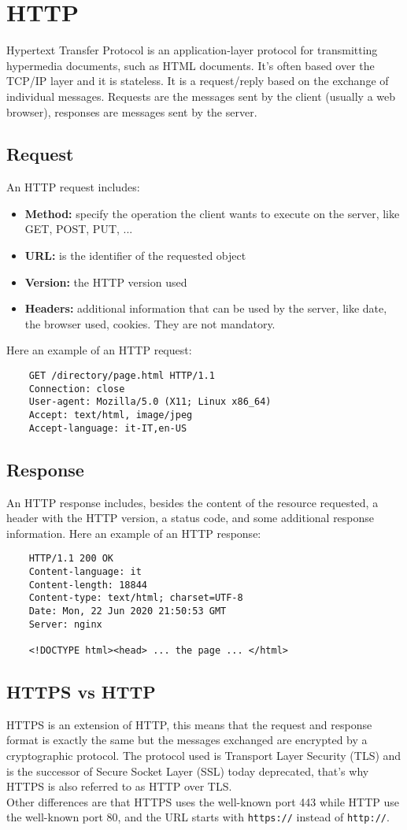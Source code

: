 \section{HTTP}
Hypertext Transfer Protocol is an application-layer protocol for transmitting hypermedia documents, such as HTML documents. It's often based over the TCP/IP layer and it is stateless. It is a request/reply based on the exchange of individual messages. Requests are the messages sent by the client (usually a web browser), responses are messages sent by the server.
\subsection{Request}
An HTTP request includes:
\begin{itemize}
    \item{\textbf{Method:} specify the operation the client wants to execute on the server, like GET, POST, PUT, ...}
    \item{\textbf{URL:} is the identifier of the requested object}
    \item{\textbf{Version:} the HTTP version used}
    \item{\textbf{Headers:} additional information that can be used by the server, like date, the browser used, cookies. They are not mandatory.}
\end{itemize}
Here an example of an HTTP request:
\begin{lstlisting}
    GET /directory/page.html HTTP/1.1
    Connection: close
    User-agent: Mozilla/5.0 (X11; Linux x86_64)
    Accept: text/html, image/jpeg
    Accept-language: it-IT,en-US
\end{lstlisting}

\subsection{Response}
An HTTP response includes, besides the content of the resource requested, a header with the HTTP version, a status code, and some additional response information.
Here an example of an HTTP response:
\begin{lstlisting}
    HTTP/1.1 200 OK
    Content-language: it
    Content-length: 18844
    Content-type: text/html; charset=UTF-8
    Date: Mon, 22 Jun 2020 21:50:53 GMT
    Server: nginx

    <!DOCTYPE html><head> ... the page ... </html>
\end{lstlisting}
\subsection{HTTPS vs HTTP}
HTTPS is an extension of HTTP, this means that the request and response format is exactly the same but the messages exchanged are encrypted by a cryptographic protocol. The protocol used is Transport Layer Security (TLS) and is the successor of Secure Socket Layer (SSL) today deprecated, that's why HTTPS is also referred to as HTTP over TLS.\\
Other differences are that HTTPS uses the well-known port 443 while HTTP use the well-known port 80, and the URL starts with \texttt{https://} instead of \texttt{http://}.
